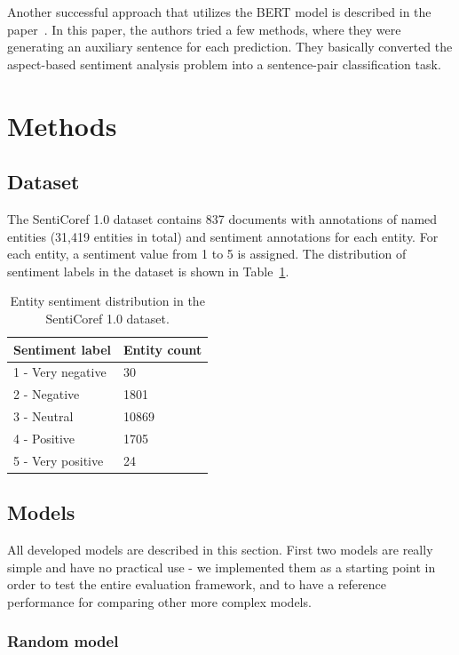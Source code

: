 \documentclass[11pt,a4paper]{article}
\begin{document}
Another successful approach that utilizes the BERT model is described in the paper~\cite{sun2019utilizing}.
In this paper, the authors tried a few methods, where they were generating an auxiliary sentence for each prediction.
They basically converted the aspect-based sentiment analysis problem into a sentence-pair classification task.



\section{Methods}

\subsection{Dataset}

The SentiCoref 1.0 dataset contains 837 documents with annotations of named entities (31,419 entities in total) and sentiment annotations for each entity. For each entity, a sentiment value from 1 to 5 is assigned. The distribution of sentiment labels in the dataset is shown in Table~\ref{tab:sentiment_distribution}.

\begin{table}[h]
\centering
\begin{tabular}{ll}
Sentiment label   & Entity count \\ \hline
1 - Very negative & 30           \\
2 - Negative      & 1801         \\
3 - Neutral       & 10869        \\
4 - Positive      & 1705         \\
5 - Very positive & 24          
\end{tabular}
\caption{Entity sentiment distribution in the SentiCoref 1.0 dataset.}
\label{tab:sentiment_distribution}
\end{table}

\subsection{Models}

All developed models are described in this section.
First two models are really simple and have no practical use - we implemented them as a starting point in order to test the entire evaluation framework, and to have a reference performance for comparing other more complex models.

\subsubsection{Random model}
\end{document}
